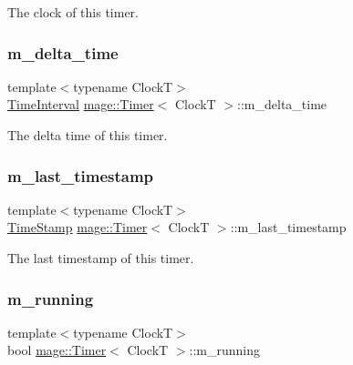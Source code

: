 The clock of this timer. \mbox{\label{classmage_1_1_timer_a9cb9bf6cd0f567a8a1fad02a89d98aa2}} 
\subsubsection{\texorpdfstring{m\+\_\+delta\+\_\+time}{m\_delta\_time}}
{\footnotesize\ttfamily template$<$typename ClockT$>$ \\
\mbox{\hyperlink{classmage_1_1_timer_a5c0fd78ceab0110637622bd0e9b8424d}{Time\+Interval}} \mbox{\hyperlink{classmage_1_1_timer}{mage\+::\+Timer}}$<$ ClockT $>$\+::m\+\_\+delta\+\_\+time\hspace{0.3cm}{\ttfamily [private]}}

The delta time of this timer. \mbox{\label{classmage_1_1_timer_a01e35b71a5fe5eebe3b05c1b675cb5ce}} 
\subsubsection{\texorpdfstring{m\+\_\+last\+\_\+timestamp}{m\_last\_timestamp}}
{\footnotesize\ttfamily template$<$typename ClockT$>$ \\
\mbox{\hyperlink{classmage_1_1_timer_abd11aea6107940b09ef3c48f62c81668}{Time\+Stamp}} \mbox{\hyperlink{classmage_1_1_timer}{mage\+::\+Timer}}$<$ ClockT $>$\+::m\+\_\+last\+\_\+timestamp\hspace{0.3cm}{\ttfamily [private]}}

The last timestamp of this timer. \mbox{\label{classmage_1_1_timer_a195789c583eb8bd3b9f0058214b74bc5}} 
\subsubsection{\texorpdfstring{m\+\_\+running}{m\_running}}
{\footnotesize\ttfamily template$<$typename ClockT$>$ \\
bool \mbox{\hyperlink{classmage_1_1_timer}{mage\+::\+Timer}}$<$ ClockT $>$\+::m\+\_\+running\hspace{0.3cm}{\ttfamily [private]}}


